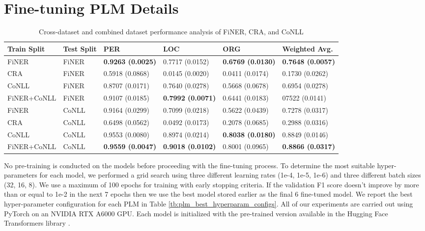 \documentclass[11pt]{article}
\begin{document}
\section{Fine-tuning PLM Details}

\begin{table*}[]
\centering
\footnotesize
\begin{tabular}{llllll}
\hline
\textbf{Train Split} & \textbf{Test Split}& \textbf{PER}& \textbf{LOC} & \textbf{ORG} & \textbf{Weighted Avg.}\\
\hline
FiNER & FiNER & \textbf{0.9263 (0.0025)} & 0.7717 (0.0152)	& \textbf{0.6769 (0.0130)} & \textbf{0.7648 (0.0057)}  \\
CRA & FiNER & 0.5918 (0.0868) & 0.0145 (0.0020) &	0.0411 (0.0174) & 0.1730 (0.0262)  \\
CoNLL & FiNER &  0.8707 (0.0171)	& 0.7640 (0.0278) &	0.5668 (0.0678) & 0.6954 (0.0278)  \\
FiNER+CoNLL & FiNER & 0.9107 (0.0185) &	\textbf{0.7992 (0.0071)}	& 0.6441 (0.0183) & 	07522 (0.0141) \\
FiNER & CoNLL & 0.9164 (0.0299)	&0.7099 (0.0218) &	0.5622 (0.0439)	&0.7278 (0.0317)  \\
CRA & CoNLL & 0.6498 (0.0562) &	0.0492 (0.0173) &	0.2078 (0.0685) &	0.2988 (0.0316)  \\
CoNLL & CoNLL & 0.9553 (0.0080)	& 0.8974 (0.0214) & 	\textbf{0.8038 (0.0180)} & 0.8849 (0.0146)  \\
FiNER+CoNLL & CoNLL & \textbf{0.9559 (0.0047)} & \textbf{0.9018 (0.0102)} & 0.8001 (0.0965) & \textbf{0.8866 (0.0317)}
 \\
\hline
\end{tabular}
\caption{Cross-dataset and combined dataset performance analysis of FiNER, CRA, and CoNLL}
\label{tb:cross_dataset}
\end{table*}

\label{app:best_hyperparam_configs}
No pre-training is conducted on the models before proceeding with the fine-tuning process. To determine the most suitable hyper-parameters for each model, we performed a grid search using three different learning rates (1e-4, 1e-5, 1e-6) and three different batch sizes (32, 16, 8).  We use a maximum of 100 epochs for training with early stopping criteria. If the validation F1 score doesn’t improve by more than or equal to 1e-2 in the next 7 epochs then we use the best model stored earlier as the final 6 fine-tuned model. We report the best hyper-parameter configuration for each PLM in Table \ref{tb:plm_best_hyperparam_configs}. All of our experiments are carried out using PyTorch \citep{pytorch} on an NVIDIA RTX A6000 GPU. Each model is initialized with the pre-trained version available in the Hugging Face Transformers library \citep{huggingface}. 
\end{document}
